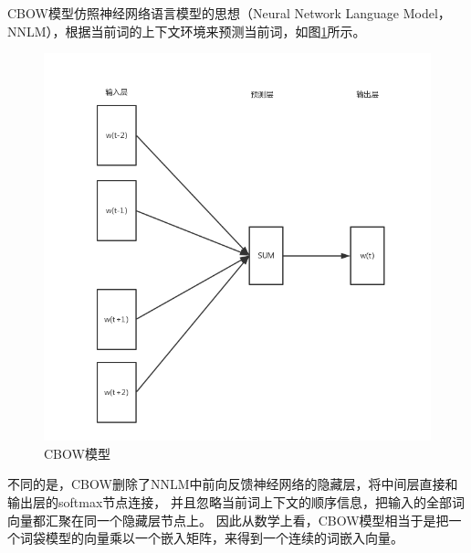CBOW模型仿照神经网络语言模型的思想（Neural Network Language Model，NNLM），根据当前词的上下文环境来预测当前词，如图\ref{cbow}所示。
\begin{figure}[h]
    \includegraphics[scale=0.6]{picture/cbow.png}
    \caption{CBOW模型}
    \label{cbow}
\end{figure}
不同的是，CBOW删除了NNLM中前向反馈神经网络的隐藏层，将中间层直接和输出层的softmax节点连接，
并且忽略当前词上下文的顺序信息，把输入的全部词向量都汇聚在同一个隐藏层节点上。
因此从数学上看，CBOW模型相当于是把一个词袋模型的向量乘以一个嵌入矩阵，来得到一个连续的词嵌入向量。

